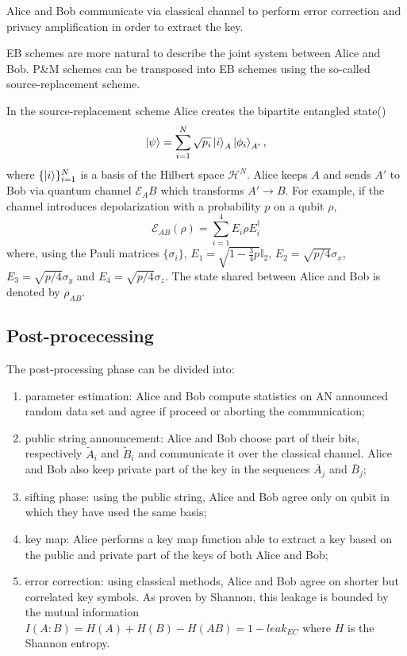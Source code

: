 \documentclass{article}
\begin{document}
    Alice and Bob communicate via classical channel to perform error correction and privacy amplification in order to extract the key.

    EB schemes are more natural to describe the joint system between Alice and Bob.
    P\&M schemes can be transposed into EB schemes using the so-called source-replacement scheme.

    In the source-replacement scheme Alice creates the bipartite entangled state(\cite{Ferenczi_2012})
    \[
        \ket{\psi} = \sum_{i=1}^N\sqrt{p_i}\ket{i}_A\ket{\phi_i}_{A'},
    \]
    where \(\{\ket{i}\}_{i=1}^N\) is a basis of the Hilbert space \(\mathcal{H}^N\).
    Alice keeps \(A\) and sends \(A'\) to Bob via quantum channel \(\mathcal{E}_AB\) which transforms \(A'\to B\).
    For example, if the channel introduces depolarization with a probability \(p\) on a qubit \(\rho\),
    \begin{equation}
        \mathcal{E}_{AB}(\rho) = \sum_{i=1}^4 E_i \rho E_i^{\dagger}
        \label{eqn:depolarizing-channel}
    \end{equation}
    where, using the Pauli matrices \(\{\sigma_i\}\), \(E_1=\sqrt{1-\frac{3}{4}p}\mathbb{I}_2\), \(E_2 = \sqrt{p/4}\sigma_x\), \(E_3 = \sqrt{p/4}\sigma_y\) and \(E_4 = \sqrt{p/4}\sigma_z\).
    The state shared between Alice and Bob is denoted by \(\rho_{AB}\).

    \subsection{Post-procecessing}
    The post-processing phase can be divided into:
    \begin{enumerate}
        \item parameter estimation: Alice and Bob compute statistics on AN announced random data set and agree if proceed or aborting the communication;
        \item public string announcement: Alice and Bob choose part of their bits, respectively \(\tilde{A}_i\) and \(\tilde{B}_i\) and communicate it over the classical channel. Alice and Bob also keep private part of the key in the sequences \(\bar{A}_{j}\) and \(\bar{B}_j\);
        \item sifting phase: using the public string, Alice and Bob agree only on qubit in which they have used the same basis;
        \item key map: Alice performs a key map function able to extract a key based on the public and private part of the keys of both Alice and Bob;
        \item error correction: using classical methods, Alice and Bob agree on shorter but correlated key symbols. As proven by Shannon, this leakage is bounded by the mutual information \(I(A:B)=H(A)+H(B)-H(AB)=1-leak_{EC}\) where \(H\) is the Shannon entropy.
    \end{enumerate}
\end{document}
